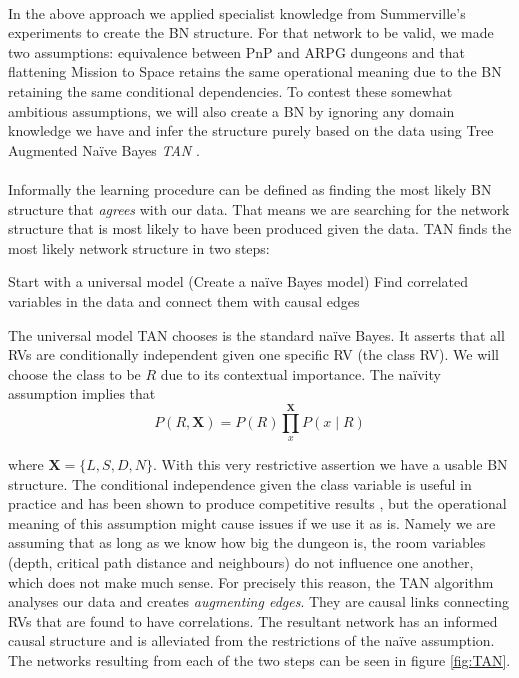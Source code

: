 \documentclass{UoYCSproject}
\begin{document}
\paragraph{}
In the above approach we applied specialist knowledge from Summerville's experiments to create the BN structure. For that network to be valid, we made two assumptions: equivalence between PnP and ARPG dungeons and that flattening Mission to Space retains the same operational meaning due to the BN retaining the same conditional dependencies. To contest these somewhat ambitious assumptions, we will also create a BN by ignoring any domain knowledge we have and infer the structure purely based on the data using Tree Augmented Na\"{i}ve Bayes \textit{TAN} \parencite{FriedmanTAN}.
\paragraph{}
Informally the learning procedure can be defined as finding the most likely BN structure that \textit{agrees} with our data. That means we are searching for the network structure that is most likely to have been produced given the data. TAN finds the most likely network structure in two steps:

\begin{outline}[enumerate]
  \1 Start with a universal model (Create a na\"{i}ve Bayes model)
  \1 Find correlated variables in the data and connect them with causal edges
\end{outline}

The universal model TAN chooses is the standard na\"{i}ve Bayes. It asserts that all RVs are conditionally independent given one specific RV (the class RV). We will choose the class to be \(R\) due to its contextual importance. The na\"{i}vity assumption implies that
\begin{equation}
  \label{eq:TAN}
  P(R,\boldsymbol X) = P(R)\prod_{x}^{\boldsymbol X} P(x \mid R)
\end{equation}

where \(\boldsymbol X = \{L, S, D, N\}\). With this very restrictive assertion we have a usable BN structure. The conditional independence given the class variable is useful in practice and has been shown to produce competitive results \parencite{RishEmpiricalBayes}, but the operational meaning of this assumption might cause issues if we use it as is. Namely we are assuming that as long as we know how big the dungeon is, the room variables (depth, critical path distance and neighbours) do not influence one another, which does not make much sense. For precisely this reason, the TAN algorithm analyses our data and creates \textit{augmenting edges}. They are causal links connecting RVs that are found to have correlations. The resultant network has an informed causal structure and is alleviated from the restrictions of the na\"{i}ve assumption. The networks resulting from each of the two steps can be seen in figure \ref{fig:TAN}.
\end{document}
